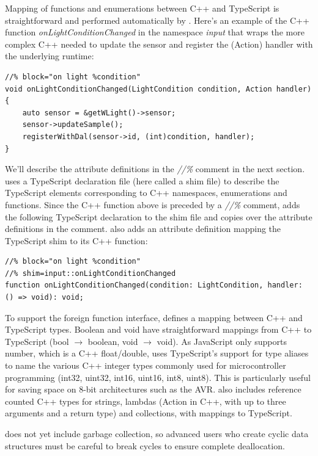 Mapping of functions and enumerations between C++ and TypeScript is straightforward
and performed automatically by \MC.
Here's an example of the C++ function \emph{onLightConditionChanged}
in the namespace \emph{input} that
wraps the more complex C++ needed to update the sensor and register the (Action)
handler with the underlying \CO runtime:
\begin{lstlisting}
//% block="on light %condition"
void onLightConditionChanged(LightCondition condition, Action handler) {
    auto sensor = &getWLight()->sensor;
    sensor->updateSample();
    registerWithDal(sensor->id, (int)condition, handler);
}
\end{lstlisting}

We'll describe the attribute definitions in the \emph{//\%} comment in the next section.
\MC uses a TypeScript declaration file (here called a shim file) to describe the TypeScript
elements corresponding to C++ namespaces, enumerations and functions.
Since the C++ function above is preceded by a \emph{//\%} comment,
\MC adds the following TypeScript declaration to the shim file and copies
over the attribute definitions in the comment. \MC also adds an attribute definition mapping
the TypeScript shim to its C++ function:

\begin{lstlisting}
//% block="on light %condition"
//% shim=input::onLightConditionChanged
function onLightConditionChanged(condition: LightCondition, handler: () => void): void;
\end{lstlisting}

To support the foreign function interface, \MC defines a mapping between C++ and TypeScript types.
Boolean and void have straightforward mappings from C++ to TypeScript (bool $\rightarrow$ boolean, void $\rightarrow$ void).
As JavaScript only supports number, which is a C++ float/double, \MC uses TypeScript's support
for type aliases to name the various C++ integer types commonly used for microcontroller programming
(int32, uint32, int16, uint16, int8, uint8).
This is particularly useful for saving space on 8-bit architectures such as the AVR.
\MC also includes reference counted C++ types for strings, lambdas (Action in C++, with
up to three arguments and a return type) and collections, with mappings to TypeScript.

\MC does not yet include garbage collection, so advanced users who create cyclic
data structures must be careful to break cycles to ensure complete deallocation.

